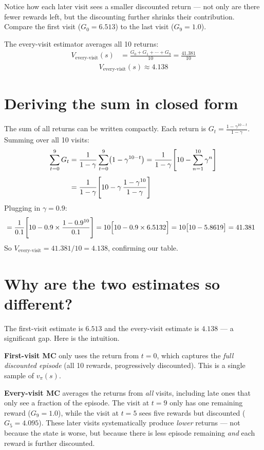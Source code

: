 \documentclass[11pt]{article}
\begin{document}
Notice how each later visit sees a smaller discounted return --- not only are there fewer rewards left, but the discounting further shrinks their contribution. Compare the first visit ($G_0 = 6.513$) to the last visit ($G_9 = 1.0$).

The every-visit estimator averages all 10 returns:
\begin{align}
    V_{\text{every-visit}}(s) &= \frac{G_0 + G_1 + \cdots + G_9}{10} = \frac{41.381}{10}
\end{align}
\begin{align}
    \boxed{V_{\text{every-visit}}(s) \approx 4.138}
\end{align}

\section*{Deriving the sum in closed form}

The sum of all returns can be written compactly. Each return is $G_t = \frac{1 - \gamma^{10-t}}{1-\gamma}$. Summing over all 10 visits:
\begin{align}
    \sum_{t=0}^{9} G_t &= \frac{1}{1-\gamma} \sum_{t=0}^{9} \bigl(1 - \gamma^{10-t}\bigr) = \frac{1}{1-\gamma}\Biggl[10 - \sum_{n=1}^{10} \gamma^n\Biggr] \notag \\[4pt]
    &= \frac{1}{1-\gamma}\Biggl[10 - \gamma\,\frac{1 - \gamma^{10}}{1 - \gamma}\Biggr]
\end{align}
Plugging in $\gamma = 0.9$:
\begin{align}
    &= \frac{1}{0.1}\Biggl[10 - 0.9 \times \frac{1 - 0.9^{10}}{0.1}\Biggr] = 10\Bigl[10 - 0.9 \times 6.5132\Bigr] = 10\bigl[10 - 5.8619\bigr] = 41.381
\end{align}
So $V_{\text{every-visit}} = 41.381 / 10 = 4.138$, confirming our table.

\section*{Why are the two estimates so different?}

The first-visit estimate is $6.513$ and the every-visit estimate is $4.138$ --- a significant gap. Here is the intuition.

\textbf{First-visit MC} only uses the return from $t = 0$, which captures the \textit{full discounted episode} (all 10 rewards, progressively discounted). This is a single sample of $v_\pi(s)$.

\textbf{Every-visit MC} averages the returns from \textit{all} visits, including late ones that only see a fraction of the episode. The visit at $t = 9$ only has one remaining reward ($G_9 = 1.0$), while the visit at $t = 5$ sees five rewards but discounted ($G_5 = 4.095$). These later visits systematically produce \textit{lower} returns --- not because the state is worse, but because there is less episode remaining \textit{and} each reward is further discounted.
\end{document}
